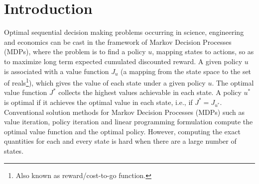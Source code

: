 \section{Introduction}\label{intro}
\begin{comment}
Markov decision processes (MDPs) is an important mathematical framework to study optimal sequential decision making problems that arise in science and engineering. Solving an MDP involves computing the optimal \emph{value-function} ($J^*$), a vector whose dimension is the number of states. MDPs with small number of states can be solved easily by conventional solution methods such as value/ policy iteration or linear programming (LP) \cite{BertB}. However, it is difficult to compute  $J^*$ exactly when there are a large number of states. A practical way to tackle the curse is to empoly function approximation, i.e., to choose an approximate value function $\tilde{J}$ instead of $J^*$ from a paramterized function class. Linear function approximation is the most common, wherein, the value function is approximated as $J^*\approx \tj=\Phi r^*$, where $\Phi$ is a feature matrix whose columns are the basis functions and $r^*$ is a weight vector to be learned. A representational advantage (in terms of the number of unknowns) is achieved by choosing fewer number of basis functions compared to the number of states. Once approximate value function $\tilde{J}$ is known, a sub-optimal policy $\tilde{u}$ which is greedy with respect to $\tilde{J}$ can be computed.  The quality of approximation depends on the quantity $||J^*-\tilde{J}||$. 
\end{comment}
Optimal sequential decision making problems occurring in science, engineering and economics can be cast in the framework of Markov Decision Processes (MDPs), where the problem is to find a policy $u$, mapping states to actions, so as to maximize long term expected cumulated discounted reward. A given policy $u$ is associated with a value function $J_u$ (a mapping from the state space to the set of reals\footnote{Also known as reward/cost-to-go function.}), which gives the value of each state under a given policy $u$. The optimal value function $J^*$ collects the highest values achievable in each state. A policy $u^*$ is optimal if it achieves the optimal value in each state, i.e., if $J^* = J_{u^*}$. Conventional solution methods for Markov Decision Processes (MDPs) such as value iteration, policy iteration and linear programming formulation compute the optimal value function and the optimal policy. However, computing the exact quantities for each and every state is hard when there are a large number of states.\par
